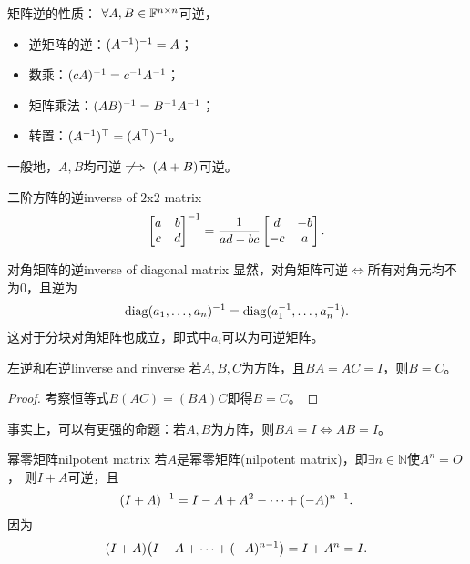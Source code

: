 \begin{corollary}
	矩阵逆的性质：
	$\forall A,B\in\mathbb F^{n\times n}$可逆，
	\begin{itemize}
		\item 逆矩阵的逆：$(A^{-1})^{-1}=A$；
		\item 数乘：$(cA)^{-1}=c^{-1} A^{-1}$；
		\item 矩阵乘法：$(AB)^{-1}=B^{-1} A^{-1}$；
		\item 转置：$(A^{-1})^\top=(A^\top)^{-1}$。
	\end{itemize}
\end{corollary}

\begin{remark}
	一般地，$A,B$均可逆$\hspace{1ex}\not\hspace{-1ex}\implies(A+B)$可逆。
\end{remark}

\begin{example}{二阶方阵的逆}{inverse of 2x2 matrix}
	\begin{equation}
		\begin{bmatrix}
			a&b\\c&d
		\end{bmatrix}^{-1}=\frac1{ad-bc}
		\begin{bmatrix}
			d&-b\\
			-c&a
		\end{bmatrix}.
	\end{equation}
\end{example}
\begin{example}{对角矩阵的逆}{inverse of diagonal matrix}
	显然，对角矩阵可逆$\iff$所有对角元均不为0，且逆为
	\begin{align}
		\operatorname{diag}(a_1,\ldots,a_n)^{-1}=\operatorname{diag}(a_1^{-1},\ldots,a_n^{-1}).
	\end{align}
	这对于分块对角矩阵也成立，即式中$a_i$可以为可逆矩阵。
\end{example}
\begin{theorem}{左逆和右逆}{linverse and rinverse}
	若$A,B,C$为方阵，且$BA=AC=I$，则$B=C$。
\end{theorem}
\begin{proof}
	考察恒等式$B(AC)=(BA)C$即得$B=C$。
\end{proof}
\begin{remark}
	事实上，可以有更强的命题：若$A,B$为方阵，则$BA=I\iff AB=I$。
\end{remark}
\begin{example}{幂零矩阵}{nilpotent matrix}
	若$A$是幂零矩阵(nilpotent matrix)，即$\exists n\in\mathbb N$使$A^n=O$，
	则$I+A$可逆，且
	\[
		(I+A)^{-1}=I-A+A^2-\cdots+(-A)^{n-1}.
	\]
	因为
	\[
		(I+A)\bigl(I-A+\cdots+(-A)^{n-1}\bigr)=I+A^n=I.
	\]
\end{example}

